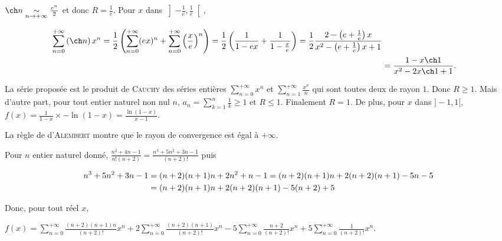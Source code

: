 {{\begin{center}
\end{center}
$\ch n\underset{n\rightarrow+\infty}{\sim}\frac{e^n}{2}$ et donc $R=\frac{1}{e}$.
Pour $x$ dans $\left]-\frac{1}{e},\frac{1}{e}\right[$,

\begin{align*}\ensuremath 
\sum_{n=0}^{+\infty}\left(\ch n\right)x^n=\frac{1}{2}\left(\sum_{n=0}^{+\infty}(ex)^n+\sum_{n=0}^{+\infty}\left(\frac{x}{e}\right)^n\right)=\frac{1}{2}\left(\frac{1}{1-ex}+\frac{1}{1-\frac{x}{e}}\right)=\frac{1}{2}\frac{2-\left(e+\frac{1}{e}\right)x}{x^2-\left(e+\frac{1}{e}\right)x+1}\\
 &=\frac{1-x\ch1}{x^2-2x\ch1+1}.
\end{align*}

\begin{center}
\shadowbox{
$\forall x\in\left]-\frac{1}{e},\frac{1}{e}\right[$, $\sum_{n=0}^{+\infty}\left(\ch n\right)x^n=\frac{1-x\ch1}{x^2-2x\ch1+1}$.
}
\end{center}
La série proposée est le produit de \textsc{Cauchy} des séries entières  $\sum_{n=0}^{+\infty}x^n$ et  $\sum_{n=1}^{+\infty}\frac{x^n}{n}$ qui sont toutes deux de rayon $1$. Donc $R\geqslant1$. Mais d'autre part, pour tout entier naturel non nul $n$, $a_n=\sum_{k=1}^{n}\frac{1}{k}\geqslant1$ et $R\leqslant1$. Finalement $R = 1$. De plus, pour $x$ dans $]-1,1[$, $f(x)=\frac{1}{1-x}\times-\ln(1-x)=\frac{\ln(1-x)}{x-1}$.

\begin{center}
\shadowbox{
$\forall x\in\left]-1,1\right[$, $\sum_{n=1}^{+\infty}\left(\sum_{k=1}^{n}\frac{1}{k}\right)x^n=\frac{\ln(1-x)}{x-1}$.
}
\end{center}
La règle de d'\textsc{Alembert} montre que le rayon de convergence est égal à $+\infty$.

Pour $n$ entier naturel donné, $\frac{n^2+4n-1}{n!(n+2)}=\frac{n^3+5n^2+3n-1}{(n+2)!}$ puis 

\begin{align*}\ensuremath
n^3+5n^2+3n-1&= (n+2)(n+1)n+2n^2+n-1 = (n+2)(n+1)n+2(n+2)(n+1) - 5n - 5\\
 &= (n+2)(n+1)n + 2(n+2)(n+1) - 5(n+2) + 5
\end{align*}

Donc, pour tout réel $x$,

\begin{center}
$f(x) =\sum_{n=0}^{+\infty}\frac{(n+2)(n+1)n}{(n+2)!}x^n +2\sum_{n=0}^{+\infty}\frac{(n+2)(n+1)}{(n+2)!}x^n- 5\sum_{n=0}^{+\infty}\frac{n+2}{(n+2)!}x^n+ 5\sum_{n=0}^{+\infty}\frac{1}{(n+2)!}x^n.$
\end{center}

}}
